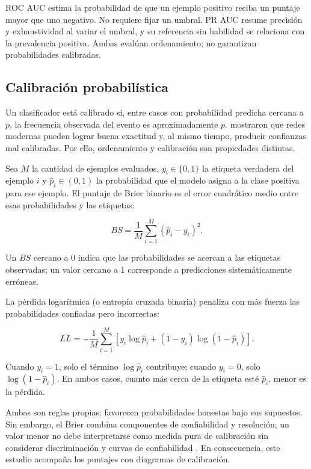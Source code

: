 ROC AUC estima la probabilidad de que un ejemplo positivo reciba un puntaje mayor que uno negativo. No requiere fijar un umbral. PR AUC resume precisión y exhaustividad al variar el umbral, y su referencia sin habilidad se relaciona con la prevalencia positiva. Ambas evalúan ordenamiento; no garantizan probabilidades calibradas.

\subsection{Calibración probabilística}

Un clasificador está calibrado si, entre casos con probabilidad predicha cercana a $p$, la frecuencia observada del evento es aproximadamente $p$. \textcite{guo2017calibration} mostraron que redes modernas pueden lograr buena exactitud y, al mismo tiempo, producir confianzas mal calibradas. Por ello, ordenamiento y calibración son propiedades distintas.

Sea $M$ la cantidad de ejemplos evaluados, $y_i\in\{0,1\}$ la etiqueta verdadera del ejemplo $i$ y $\hat p_i\in(0,1)$ la probabilidad que el modelo asigna a la clase positiva para ese ejemplo. El puntaje de Brier binario es el error cuadrático medio entre esas probabilidades y las etiquetas:

\begin{equation}
  BS=\frac{1}{M}\sum_{i=1}^{M}(\hat p_i-y_i)^2.
\end{equation}

Un $BS$ cercano a 0 indica que las probabilidades se acercan a las etiquetas observadas; un valor cercano a 1 corresponde a predicciones sistemáticamente erróneas.

La pérdida logarítmica (o entropía cruzada binaria) penaliza con más fuerza las probabilidades confiadas pero incorrectas:

\begin{equation}
  LL=-\frac{1}{M}\sum_{i=1}^{M}\left[y_i\log\hat p_i+(1-y_i)\log(1-\hat p_i)\right].
\end{equation}

Cuando $y_i=1$, solo el término $\log\hat p_i$ contribuye; cuando $y_i=0$, solo $\log(1-\hat p_i)$. En ambos casos, cuanto más cerca de la etiqueta esté $\hat p_i$, menor es la pérdida.

Ambas son reglas propias: favorecen probabilidades honestas bajo sus supuestos. Sin embargo, el Brier combina componentes de confiabilidad y resolución; un valor menor no debe interpretarse como medida pura de calibración sin considerar discriminación y curvas de confiabilidad \parencite{silvafilho2023calibration}. En consecuencia, este estudio acompaña los puntajes con diagramas de calibración.

